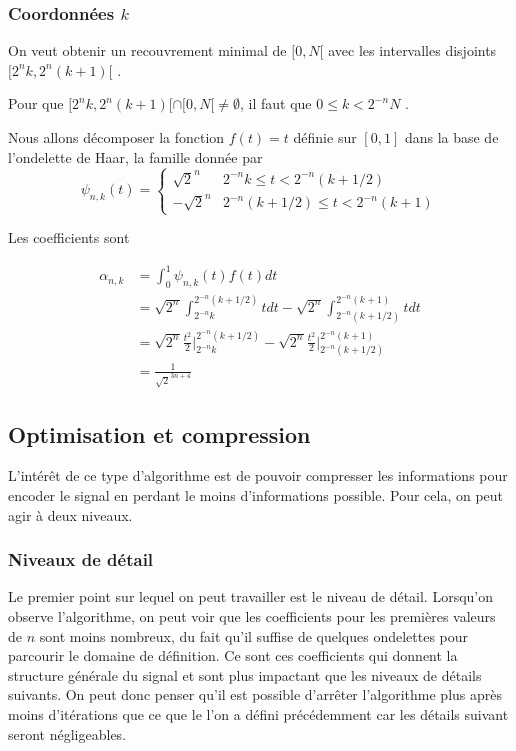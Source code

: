 \subsubsection{Coordonnées $k$}

On veut obtenir un recouvrement minimal de $[0,N[$ avec les intervalles disjoints $[2^{n}k,2^{n}(k+1)[$ .

Pour que $[2^{n}k,2^{n}(k+1)[\cap[0,N[\neq\emptyset$, il faut que $0\le k< 2^{-n}N$ .

\begin{myexmpl}
	Nous allons décomposer la fonction $f(t)=t$ définie sur $[0, 1]$ dans la base de l'ondelette de Haar, la famille donnée par
	$$\psi_{n, k}(t) = \left\{
	\begin{array}{cc}
		\sqrt{2}^n & 2^{-n}k \leqslant t < 2^{-n} (k+1/2) \\
		-\sqrt{2}^n & 2^{-n}(k+1/2) \leqslant t < 2^{-n} (k+1)
	\end{array}
	\right.$$
	
	Les coefficients sont 
	
	\begin{align*}
		\alpha_{n, k} &= \int_{0}^{1} \psi_{n, k}(t) f(t) dt \\
		&= \sqrt{2^n} \int_{2^{-n}k}^{2^{-n}(k+1/2)} t dt - \sqrt{2^n} \int_{2^{-n}(k+1/2)}^{2^{-n}(k+1)} t dt \\
		&= \sqrt{2^n} \frac{t^2}{2} \bigg \vert_{2^{-n} k}^{2^{-n}(k+1/2)} - \sqrt{2^n} \frac{t^2}{2} \bigg \vert_{2^{-n} (k+1/2)}^{2^{-n}(k+1)} \\
		&= \frac{1}{\sqrt{2}^{3n + 4}}
	\end{align*}
\end{myexmpl}



\subsection{Optimisation et compression}

L'intérêt de ce type d'algorithme est de pouvoir compresser les informations pour encoder le signal en perdant le moins d'informations possible. Pour cela, on peut agir à deux niveaux.

\subsubsection{Niveaux de détail}
	Le premier point sur lequel on peut travailler est le niveau de détail. Lorsqu'on observe l'algorithme, on peut voir que les coefficients pour les premières valeurs de $n$ sont moins nombreux, du fait qu'il suffise de quelques ondelettes pour parcourir le domaine de définition. Ce sont ces coefficients qui donnent la structure générale du signal et sont plus impactant que les niveaux de détails suivants. On peut donc penser qu'il est possible d'arrêter l'algorithme plus après moins d'itérations que ce que le l'on a défini précédemment car les détails suivant seront négligeables. 

